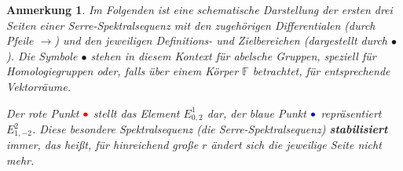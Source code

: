 \documentclass[12pt]{article}
\numberwithin{conj}{section}
\newtheorem{remark}[conj]{Anmerkung}
\begin{document}
    \begin{remark}
        Im Folgenden ist eine schematische Darstellung der ersten drei Seiten einer Serre-Spektralsequenz
        mit den zugehörigen Differentialen (durch Pfeile $\rightarrow$) und den jeweiligen
        Definitions- und Zielbereichen (dargestellt durch $\bullet$). Die Symbole $\bullet$
        stehen in diesem Kontext für abelsche Gruppen, speziell für Homologiegruppen
        oder, falls über einem Körper $\mathbb{F}$ betrachtet, für entsprechende
        Vektorräume.

        Der rote Punkt $\color{red}
        \bullet$ stellt das Element $E^{1}_{0,2}$ dar, der blaue Punkt $\color{blue}
        \bullet$ repräsentiert $E^{2}_{1,-2}$. Diese besondere Spektralsequenz (die Serre-Spektralsequenz)
        \textbf{stabilisiert} immer, das heißt, für hinreichend große $r$ ändert sich
        die jeweilige Seite nicht mehr.


\end{remark}
\end{document}
